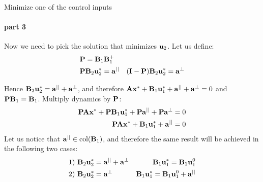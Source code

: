 \documentclass{beamer}
\begin{document}
\begin{frame}{Minimize one of the control inputs}
\framesubtitle{part 3}
\begin{flushleft}

Now we need to pick the solution that minimizes $\mathbf{u}_2$. Let us define:
%
\begin{align*}
    & \mathbf{P} = \mathbf{B}_1 \mathbf{B}^+_1 & \\
    & \mathbf{P} \mathbf{B}_2 \mathbf{u}^*_2 = \mathbf{a}^{||} & (\mathbf{I} - \mathbf{P}) \mathbf{B}_2 \mathbf{u}^*_2 = \mathbf{a}^\perp
\end{align*}

Hence $\mathbf{B}_2 \mathbf{u}^*_2 = \mathbf{a}^{||} + \mathbf{a}^\perp$, and therefore $\mathbf{A} \mathbf{x}^* + \mathbf{B}_1 \mathbf{u}^*_1 + \mathbf{a}^{||} + \mathbf{a}^\perp = 0$ and $\mathbf{P} \mathbf{B}_1 = \mathbf{B}_1$. Multiply dynamics by $\mathbf{P}$:
%
\begin{align*}
    \mathbf{P}\mathbf{A} \mathbf{x}^* + \mathbf{P}\mathbf{B}_1 \mathbf{u}^*_1 + \mathbf{P}\mathbf{a}^{||} + \mathbf{P}\mathbf{a}^\perp = 0 \\
    \mathbf{P}\mathbf{A} \mathbf{x}^* + \mathbf{B}_1 \mathbf{u}^*_1 + \mathbf{a}^{||} = 0
\end{align*}
%
Let us notice that $\mathbf{a}^{||} \in \text{col}(\mathbf{B}_1)$, and therefore the same result will be achieved in the following two cases:
%
\begin{align*}
    1) \ & \mathbf{B}_2 \mathbf{u}^*_2 = \mathbf{a}^{||} + \mathbf{a}^\perp & 
    \mathbf{B}_1 \mathbf{u}^*_1 = \mathbf{B}_1 \mathbf{u}_1^0 \\
    2) \ & \mathbf{B}_2 \mathbf{u}^*_2 = \mathbf{a}^\perp & 
    \mathbf{B}_1 \mathbf{u}^*_1 = \mathbf{B}_1 \mathbf{u}_1^0 + \mathbf{a}^{||}
\end{align*}

\end{flushleft}
\end{frame}
\end{document}
